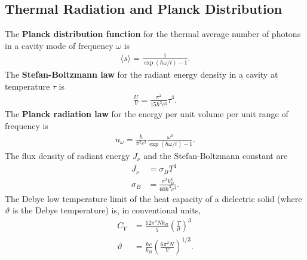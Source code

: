 \begin{multicols}{2}
	\section{Thermal Radiation and Planck Distribution}
	The \textbf{Planck distribution function} for the thermal average number of photons in a cavity mode of frequency $\omega$ is
	\begin{align}
		\langle s \rangle = \frac{1}{\exp(\hbar \omega/t)-1}.
	\end{align}
	The \textbf{Stefan-Boltzmann law} for the radiant energy density in a cavity at temperature $\tau$ is
	\begin{align}
		\frac{U}{V} = \frac{\pi^2}{15\hbar^3 c^3}\tau^4.	
	\end{align}
	The \textbf{Planck radiation law} for the energy per unit volume per unit range of frequency is
	\begin{align}
		u_\omega = \frac{\hbar}{\pi^2c^3}\frac{\omega^3}{\exp(\hbar \omega/t)-1}.
	\end{align}
	The flux density of radiant energy $J_\nu$ and the Stefan-Boltzmann constant are
	\begin{align}
		J_\nu &= \sigma_BT^4 \\
		\sigma_B &= \frac{\pi^2k_B^4}{60\hbar^3c^3}.
	\end{align}
	The Debye low temperature limit of the heat capacity of a dielectric solid (where $\vartheta$ is the Debye temperature) is, in conventional units,
	\begin{align}
		C_V &= \frac{12\pi^4Nk_B}{5}\left(\frac{T}{\vartheta}\right)^3 \\
		\vartheta &= \frac{\hbar c}{k_B}\left(\frac{6\pi^2N}{V}\right)^{1/3}.
	\end{align}
\end{multicols}